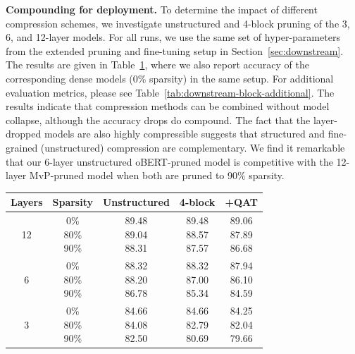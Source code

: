 \documentclass[11pt]{article}
\begin{document}
\noindent\textbf{Compounding for deployment.} To determine the impact of different compression schemes, we investigate unstructured and 4-block pruning of the 3, 6, and 12-layer models. For all runs, we use the same set of hyper-parameters from the extended pruning and fine-tuning setup in Section~\ref{sec:downstream}. The results are given in Table~\ref{tab:downstream-block}, where we also report accuracy of the corresponding dense models (0\% sparsity) in the same setup. For additional evaluation metrics, please see Table~\ref{tab:downstream-block-additional}. The results indicate that compression methods can be combined without model collapse, although the accuracy drops do compound. The fact that the layer-dropped models are also highly compressible suggests that structured and fine-grained (unstructured) compression are complementary. We find it remarkable that our 6-layer unstructured oBERT-pruned model is competitive with the 12-layer MvP-pruned model when both are pruned to 90\% sparsity.
\begin{table}
    \centering
    \label{tab:downstream-block}
    {\small
    \begin{tabular}{c|c|c|cc}
        \toprule
        Layers & Sparsity & Unstructured & 4-block & +QAT \\
        \midrule
        12 &  \makecell{0\% \\ 80\% \\90\%} & \makecell{89.48 \\ 89.04 \\ 88.31} & \makecell{89.48 \\ 88.57 \\ 87.57} & \makecell{89.06 \\ 87.89 \\ 86.68}\\
        \midrule
        6 & \makecell{0\% \\ 80\% \\90\%} & \makecell{88.32 \\ 88.20 \\ 86.78} & \makecell{88.32 \\ 87.00 \\ 85.34}  & \makecell{87.94 \\ 86.10 \\ 84.59}\\
        \midrule
        3 & \makecell{0\% \\ 80\% \\90\%}  & \makecell{84.66 \\ 84.08 \\ 82.50} & \makecell{84.66 \\ 82.79 \\ 80.69} & \makecell{84.25 \\ 82.04 \\ 79.66} \\
        \bottomrule
    \end{tabular}
    }
    \vspace{-0.1in}
\end{table}
\end{document}
